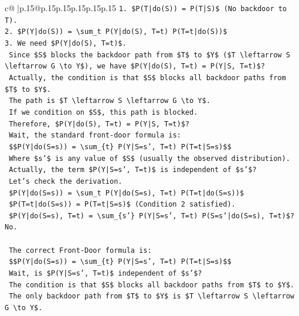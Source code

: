 \documentclass{article}
\begin{document}
{\begin{supertabular}{c@{$\;$}|p{.15\linewidth}@{}p{.15\linewidth}p{.15\linewidth}p{.15\linewidth}p{.15\linewidth}p{.15\linewidth}}
{{{\texttt{1. \$P(T|do(S)) = P(T|S)\$ (No backdoor to T).} \\
\texttt{2. \$P(Y|do(S)) = \textbackslash{}sum\_t P(Y|do(S), T=t) P(T=t|do(S))\$} \\
\texttt{3. We need \$P(Y|do(S), T=t)\$.} \\
\texttt{   Since \$S\$ blocks the backdoor path from \$T\$ to \$Y\$ (\$T \textbackslash{}leftarrow S \textbackslash{}leftarrow G \textbackslash{}to Y\$), we have \$P(Y|do(S), T=t) = P(Y|S, T=t)\$?} \\
\texttt{   Actually, the condition is that \$S\$ blocks all backdoor paths from \$T\$ to \$Y\$.} \\
\texttt{   The path is \$T \textbackslash{}leftarrow S \textbackslash{}leftarrow G \textbackslash{}to Y\$.} \\
\texttt{   If we condition on \$S\$, this path is blocked.} \\
\texttt{   Therefore, \$P(Y|do(S), T=t) = P(Y|S, T=t)\$?} \\
\texttt{   Wait, the standard front{-}door formula is:} \\
\texttt{   \$\$P(Y|do(S=s)) = \textbackslash{}sum\_\{t\} P(Y|S=s', T=t) P(T=t|S=s)\$\$} \\
\texttt{   Where \$s'\$ is any value of \$S\$ (usually the observed distribution).} \\
\texttt{   Actually, the term \$P(Y|S=s', T=t)\$ is independent of \$s'\$?} \\
\texttt{   Let's check the derivation.} \\
\texttt{   \$P(Y|do(S=s)) = \textbackslash{}sum\_t P(Y|do(S=s), T=t) P(T=t|do(S=s))\$} \\
\texttt{   \$P(T=t|do(S=s)) = P(T=t|S=s)\$ (Condition 2 satisfied).} \\
\texttt{   \$P(Y|do(S=s), T=t) = \textbackslash{}sum\_\{s'\} P(Y|S=s', T=t) P(S=s'|do(S=s), T=t)\$? No.} \\
\\ 
\texttt{   The correct Front{-}Door formula is:} \\
\texttt{   \$\$P(Y|do(S=s)) = \textbackslash{}sum\_\{t\} P(Y|S=s', T=t) P(T=t|S=s)\$\$} \\
\texttt{   Wait, is \$P(Y|S=s', T=t)\$ independent of \$s'\$?} \\
\texttt{   The condition is that \$S\$ blocks all backdoor paths from \$T\$ to \$Y\$.} \\
\texttt{   The only backdoor path from \$T\$ to \$Y\$ is \$T \textbackslash{}leftarrow S \textbackslash{}leftarrow G \textbackslash{}to Y\$.} \\
}}}
\end{supertabular}}
\end{document}
